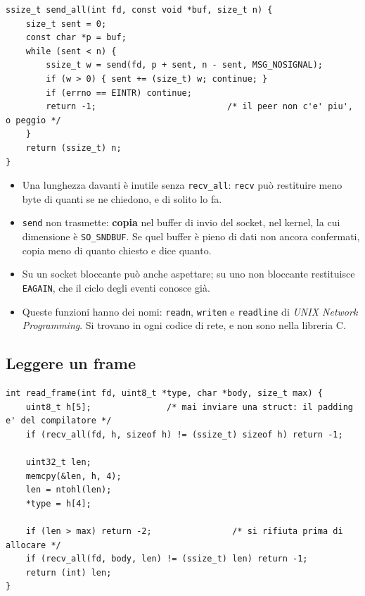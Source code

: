 \begin{lstlisting}[language={[POSIX]C}, style=wnumbers, title={send\_all}]
ssize_t send_all(int fd, const void *buf, size_t n) {
    size_t sent = 0;
    const char *p = buf;
    while (sent < n) {
        ssize_t w = send(fd, p + sent, n - sent, MSG_NOSIGNAL);
        if (w > 0) { sent += (size_t) w; continue; }
        if (errno == EINTR) continue;
        return -1;                          /* il peer non c'e' piu', o peggio */
    }
    return (ssize_t) n;
}
\end{lstlisting}

\begin{itemize}
    \item Una lunghezza davanti è inutile senza \texttt{recv\_all}: \texttt{recv} può restituire meno byte di quanti se ne
          chiedono, e di solito lo fa.
    \item \texttt{send} non trasmette: \textbf{copia} nel buffer di invio del socket, nel kernel, la cui dimensione è
          \texttt{SO\_SNDBUF}. Se quel buffer è pieno di dati non ancora confermati, copia meno di quanto chiesto e dice
          quanto.
    \item Su un socket bloccante può anche aspettare; su uno non bloccante restituisce \texttt{EAGAIN}, che il ciclo degli
          eventi conosce già.
    \item Queste funzioni hanno dei nomi: \texttt{readn}, \texttt{writen} e \texttt{readline} di \emph{UNIX Network
          Programming}. Si trovano in ogni codice di rete, e non sono nella libreria C.
\end{itemize}

\subsection{Leggere un frame}

\begin{lstlisting}[language={[POSIX]C}, style=wnumbers, title={read\_frame: due letture, sempre}]
int read_frame(int fd, uint8_t *type, char *body, size_t max) {
    uint8_t h[5];               /* mai inviare una struct: il padding e' del compilatore */
    if (recv_all(fd, h, sizeof h) != (ssize_t) sizeof h) return -1;

    uint32_t len;
    memcpy(&len, h, 4);
    len = ntohl(len);
    *type = h[4];

    if (len > max) return -2;                /* si rifiuta prima di allocare */
    if (recv_all(fd, body, len) != (ssize_t) len) return -1;
    return (int) len;
}
\end{lstlisting}

